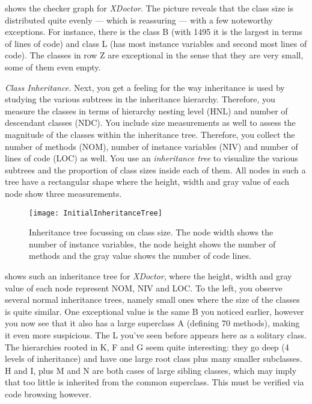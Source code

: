 \documentclass[a4paper,10pt,twoside]{book}
\begin{document}
 shows the checker graph for \emph{XDoctor}. The picture reveals 
that the class size is distributed quite evenly --- which is reassuring --- with a few 
noteworthy exceptions. For instance, there is the class B (with 1495 it is the largest in 
terms of lines of code) and class L (has most instance variables and second most lines of 
code). The classes in row Z are exceptional in the sense that they are very small, some of 
them even empty.

\noindent
\emph{Class Inheritance.}
Next, you get a feeling for the way inheritance is used by studying the various subtrees in 
the inheritance hierarchy. Therefore, you measure the classes in terms of hierarchy nesting 
level (HNL) and number of descendant classes (NDC). You include size measurements as well 
to assess the magnitude of the classes within the inheritance tree. Therefore, you collect 
the number of methods (NOM), number of instance variables (NIV) and number of lines of code 
(LOC) as well. You use an \emph{inheritance tree} to visualize the various subtrees and the 
proportion of class sizes inside each of them. All nodes in such a tree have a rectangular 
shape where the height, width and gray value of each node show three measurements.

\begin{figure}
\begin{center}
\texttt{[image: InitialInheritanceTree]}
\caption{Inheritance tree focussing on class size. The node width shows the number of 
instance variables, the node height shows the number of methods and the gray value shows 
the number of code lines.}
\end{center}
\end{figure}

 shows such an inheritance tree for \emph{XDoctor}, where 
the height, width and gray value of each node represent NOM, NIV and LOC. To the left, you 
observe several normal inheritance trees, namely small ones where the size of the classes 
is quite similar. One exceptional value is the same B you noticed earlier, however you now 
see that it also has a large superclass A (defining 70 methods), making it even more 
suspicious. The L you've seen before appears here as a solitary class. The hierarchies 
rooted in K, F and G seem quite interesting: they go deep (4 levels of inheritance) and 
have one large root class plus many smaller subclasses. H and I, plus M and N are both 
cases of large sibling classes, which may imply that too little is inherited from the 
common superclass. This must be verified via code browsing however.
\end{document}
